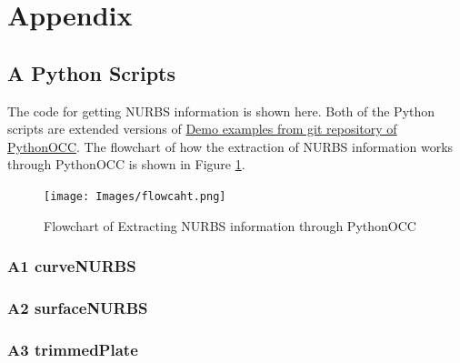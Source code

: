 \documentclass[12pt, a4paper]{report}
\begin{document}
\appendix

\chapter*{Appendix} \label{chap: Appendix}
\section*{A  Python Scripts}
\label{app:A}
The code for getting NURBS information is shown here. Both of the Python scripts are extended versions of  \href{https://github.com/tpaviot/pythonocc-demos}{Demo examples from git repository of PythonOCC}. The flowchart of how the extraction of NURBS information works through PythonOCC is shown in Figure \ref{fig:pythonoccFlowchart}.
\begin{figure}[H]
\centering
\texttt{[image: Images/flowcaht.png]}
\caption{Flowchart of Extracting NURBS information through PythonOCC}
\label{fig:pythonoccFlowchart}
\end{figure}

\subsection*{A1  curveNURBS}\label{Appendix_A1_curveNURBS}

\subsection*{A2  surfaceNURBS}\label{Appendix_A2_surfaceNURBS}

\subsection*{A3  trimmedPlate}\appendix\label{app Appendix_A3_trimPlate}

\newpage


\end{document}
